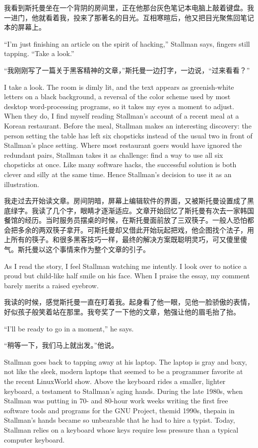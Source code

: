 \ifdefined\chs
我看到斯托曼坐在一个背阴的房间里，正在他那台灰色笔记本电脑上敲着键盘。我一进门，他就看着我，投来了那著名的目光。互相寒暄后，他又把目光聚焦回笔记本的屏幕上。
\fi

\ifdefined\eng
``I'm just finishing an article on the spirit of hacking,'' Stallman says, fingers still tapping. ``Take a look.''
\fi

\ifdefined\chs
``我刚刚写了一篇关于黑客精神的文章，''斯托曼一边打字，一边说，``过来看看？''
\fi

\ifdefined\eng
I take a look. The room is dimly lit, and the text appears as greenish-white letters on a black background, a reversal of the color scheme used by most desktop word-processing programs, so it takes my eyes a moment to adjust. When they do, I find myself reading Stallman's account of a recent meal at a Korean restaurant. Before the meal, Stallman makes an interesting discovery: the person setting the table has left six chopsticks instead of the usual two in front of Stallman's place setting. Where most restaurant goers would have ignored the redundant pairs, Stallman takes it as challenge: find a way to use all six chopsticks at once. Like many software hacks, the successful solution is both clever and silly at the same time. Hence Stallman's decision to use it as an illustration.
\fi

\ifdefined\chs
我走过去开始读文章。房间阴暗，屏幕上编辑软件的界面，又被斯托曼设置成了黑底绿字。我读了几个字，眼睛才逐渐适应。文章开始回忆了斯托曼有次去一家韩国餐馆的经历。当时服务员摆桌的时候，在斯托曼面前放了三双筷子。一般人恐怕都会把多余的两双筷子拿开。可斯托曼却又借此开始玩起把戏，他企图找个法子，用上所有的筷子。和很多黑客技巧一样，最终的解决方案既聪明灵巧，可又傻里傻气。斯托曼以这个事情来作为整个文章的引子。
\fi

\ifdefined\eng
As I read the story, I feel Stallman watching me intently. I look over to notice a proud but child-like half smile on his face. When I praise the essay, my comment barely merits a raised eyebrow.
\fi

\ifdefined\chs
我读的时候，感觉斯托曼一直在盯着我。起身看了他一眼，见他一脸骄傲的表情，好似孩子般笑着站在那里。我夸奖了一下他的文章，勉强让他的眉毛抬了抬。
\fi

\ifdefined\eng
``I'll be ready to go in a moment,'' he says.
\fi

\ifdefined\chs
``稍等一下，我们马上就出发。''他说。
\fi

\ifdefined\eng
Stallman goes back to tapping away at his laptop. The laptop is gray and boxy, not like the sleek, modern laptops that seemed to be a programmer favorite at the recent LinuxWorld show. Above the keyboard rides a smaller, lighter keyboard, a testament to Stallman's aging hands. During the \ifdefined\vone late 1980s, when Stallman was putting in 70- and 80-hour work weeks writing the first free software tools and programs for the GNU Project, the\fi\ifdefined\vtwo mid 1990s, the\fi pain in Stallman's hands became so unbearable that he had to hire a typist. Today, Stallman relies on a keyboard whose keys require less pressure than a typical computer keyboard.
\fi

